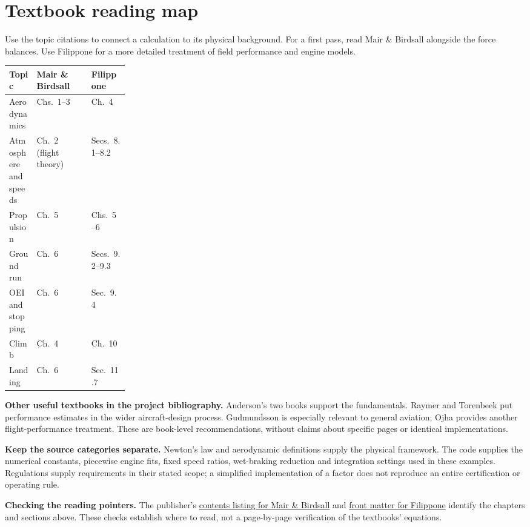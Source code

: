 \documentclass[11pt,letterpaper]{article}
\newcommand{\topic}[1]{\clearpage\section{#1}}
\begin{document}
\topic{Textbook reading map}
Use the topic citations to connect a calculation to its physical background.
For a first pass, read Mair \& Birdsall alongside the force balances. Use
Filippone for a more detailed treatment of field performance and engine models.

\begin{tabularx}{\linewidth}{@{}p{0.23\linewidth}XX@{}}
\toprule
Topic & Mair \& Birdsall \cite{mair} & Filippone \cite{filippone}\\\midrule
Aerodynamics & Chs.~1--3 & Ch.~4\\
Atmosphere and speeds & Ch.~2 (flight theory) & Secs.~8.1--8.2\\
Propulsion & Ch.~5 & Chs.~5--6\\
Ground run & Ch.~6 & Secs.~9.2--9.3\\
OEI and stopping & Ch.~6 & Sec.~9.4\\
Climb & Ch.~4 & Ch.~10\\
Landing & Ch.~6 & Sec.~11.7\\\bottomrule
\end{tabularx}

\textbf{Other useful textbooks in the project bibliography.}
Anderson's two books \cite{anderson-performance,anderson-flight} support the
fundamentals. Raymer \cite{raymer} and Torenbeek \cite{torenbeek} put performance
estimates in the wider aircraft-design process. Gudmundsson \cite{gudmundsson}
is especially relevant to general aviation; Ojha \cite{ojha} provides another
flight-performance treatment. These are book-level recommendations, without
claims about specific pages or identical implementations.

\begin{keyidea}
\textbf{Keep the source categories separate.}
Newton's law and aerodynamic definitions supply the physical framework.
The code supplies the numerical constants, piecewise engine fits, fixed speed
ratios, wet-braking reduction and integration settings used in these examples.
Regulations supply requirements in their stated scope; a simplified implementation
of a factor does not reproduce an entire certification or operating rule.
\end{keyidea}

\textbf{Checking the reading pointers.}
The publisher's \href{https://www.cambridge.org/core/books/abs/aircraft-performance/index/0715423089460781606F4D741A91D1D5}{contents listing for Mair \& Birdsall}
and \href{https://assets.cambridge.org/97811070/24007/frontmatter/9781107024007_frontmatter.pdf}{front matter for Filippone}
identify the chapters and sections above. These checks establish where to read,
not a page-by-page verification of the textbooks' equations.
\end{document}
